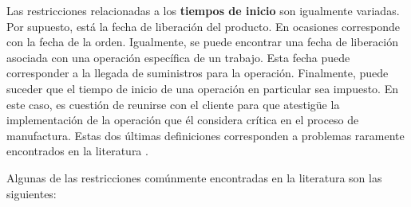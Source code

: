 \documentclass[spanish,draft,12pt,headsepline,footsepline,paper=letter]{scrreprt}
\begin{document}
Las restricciones relacionadas a los \textbf{tiempos de inicio} son igualmente variadas. Por supuesto, está la fecha de liberación del producto. En ocasiones corresponde con la fecha de la orden. Igualmente, se puede encontrar una fecha de liberación asociada con una operación específica de un trabajo. Esta fecha puede corresponder a la llegada de suministros para la operación. Finalmente, puede suceder que el tiempo de inicio de una operación en particular sea impuesto. En este caso, es cuestión de reunirse con el cliente para que atestigüe la implementación de la operación que él considera crítica en el proceso de manufactura. Estas dos últimas definiciones corresponden a problemas raramente encontrados en la literatura \citep[p.~10]{TKindt2002}.

Algunas de las restricciones comúnmente encontradas en la literatura son las siguientes:
\end{document}

